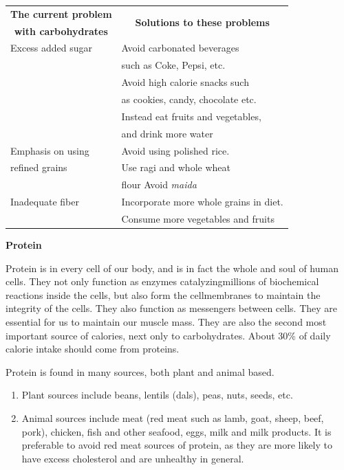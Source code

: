 \begin{center}
\begin{tabular}{|l|l|}
\hline
\textbf{The current problem} & \multicolumn{1}{c|}{\multirow{2}{5cm}{\textbf{Solutions to these problems}}}\\
\multicolumn{1}{|c|}{\textbf{with carbohydrates}} &\\
\hline
Excess added sugar & Avoid carbonated beverages\\
 & such as Coke, Pepsi, etc.\\
 & Avoid high calorie snacks such\\
 & as cookies, candy, chocolate etc.\\
 & Instead eat fruits and vegetables,\\
 & and drink more water\\
\hline
Emphasis on using & Avoid using polished rice.\\
refined grains & Use ragi and whole wheat\\
 & flour Avoid \textit{maida}\\
\hline
Inadequate fiber & Incorporate more whole grains in diet.\\
 & Consume more vegetables and fruits\\
\hline
\end{tabular}
\end{center}

\noindent\textbf{Protein}

Protein is in every cell of our body, and is in fact the whole and soul of human cells. They not only function as enzymes catalyzing\break millions of biochemical reactions inside the cells, but also form the cell\break membranes to maintain the integrity of the cells. They also function as messengers between cells. They are essential for us to maintain our muscle mass. They are also the second most important source of calories, next only to carbohydrates. About 30\% of daily calorie intake should come from proteins.

\noindent Protein is found in many sources, both plant and animal based.

\vspace{-\topsep}
\begin{enumerate}[\ding{118}]
\itemsep=0pt
\item Plant sources include beans, lentils (dals), peas, nuts, seeds, etc.
\item Animal sources include meat (red meat such as lamb, goat, sheep, beef, pork), chicken, fish and other seafood, eggs, milk and milk products. It is preferable to avoid red meat sources of protein, as they are more likely to have excess cholesterol and are unhealthy in general.
\end{enumerate}
\vspace{-\topsep}

